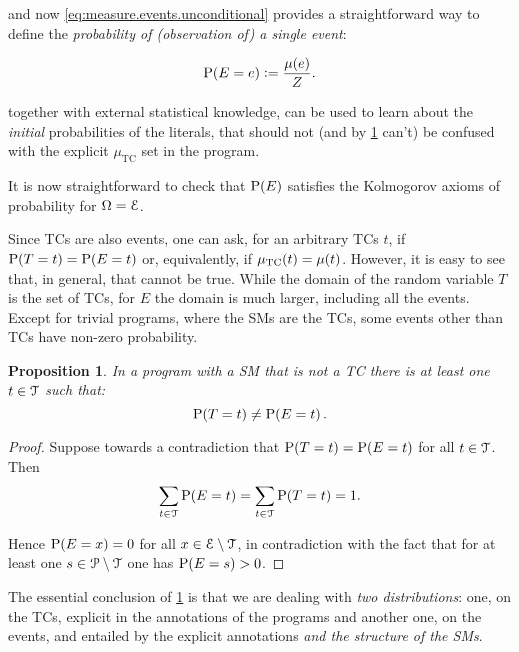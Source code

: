 \documentclass{article}
\newtheorem{proposition}{Proposition}
\newcommand{\at}[1]{\ensuremath{\!\del{#1}}}
\newcommand{\cla}[1]{\ensuremath{{\cal #1}}}
\newcommand{\prfunc}{\ensuremath{\mathrm{P}}}
\newcommand{\pr}[1]{\ensuremath{\prfunc\at{#1}}}
\newcommand{\pw}[1]{\ensuremath{\mu\at{#1}}}
\newcommand{\pwcfname}{\ensuremath{\mu_{\textrm{TC}}}}
\newcommand{\pwc}[1]{\ensuremath{\pwcfname\at{#1}}}
\newcommand{\PROBFset}{\ensuremath{\cla{P}}}
\newcommand{\TCHOICEset}{\ensuremath{\cla{T}}}
\newcommand{\EVENTSset}{\ensuremath{\cla{E}}}
\newcommand{\franc}[1]{{\color{green!30!black}#1}}
\begin{document}
and now \cref{eq:measure.events.unconditional} provides a
straightforward way to define the \franc{\emph{probability of (observation of)
  a single event}}:

\begin{equation}
	\pr{E = e} := \frac{\pw{e}}{Z}.\label{eq:probability.event}
\end{equation}

 together with external
statistical knowledge, can be used to learn about the \emph{initial}
probabilities of the literals, that should not (and by
\cref{prop:two.distributions} can't) be confused with the explicit
$\pwcfname$ set in the program.

It is now straightforward to check that $\pr{E}$ satisfies the
Kolmogorov axioms of probability for $\Omega = \EVENTSset$.

Since \aclp{TC} are also events, one can ask, for an arbitrary
\aclp{TC} $t$, if $\pr{T = t} = \pr{E = t}$ or, equivalently, if
$\pwc{t} = \pw{t}$.  However, it is easy to see that, in general, that
cannot be true.  While the domain of the random variable $T$ is the
set of \aclp{TC}, for $E$ the domain is much larger, including all the
events.  Except for trivial programs, where the \acp{SM} are the
\acp{TC}, some events other than \aclp{TC} have non-zero probability.

\begin{proposition} \label{prop:two.distributions} %
  In a program with a \acl{SM} that is not a \acl{TC} there is at
  least one $t\in\TCHOICEset$ such that:
  \begin{equation}
	\pr{T = t} \not= \pr{E = t}. \label{eq:two.distributions}
  \end{equation}
\end{proposition}

\begin{proof}
  Suppose towards a contradiction that $\pr{T = t} = \pr{E = t}$ for
  all $t \in \TCHOICEset$.  Then
  $$
  \sum_{t\in\TCHOICEset} \pr{E = t} = \sum_{t\in\TCHOICEset} \pr{T = t} = 1.
  $$

  Hence $\pr{E = x} = 0$ for all
  $x \in \EVENTSset\setminus\TCHOICEset$, in contradiction with the
  fact that for at least one $s \in \PROBFset\setminus\TCHOICEset$ one
  has $\pr{E = s} > 0$.
\end{proof}

The essential conclusion of \cref{prop:two.distributions} is that we
are dealing with \emph{two distributions}: one, on the \acp{TC},
explicit in the annotations of the programs and another one, on the
events, and entailed by the explicit annotations \emph{and the
  structure of the \aclp{SM}}.
\end{document}
